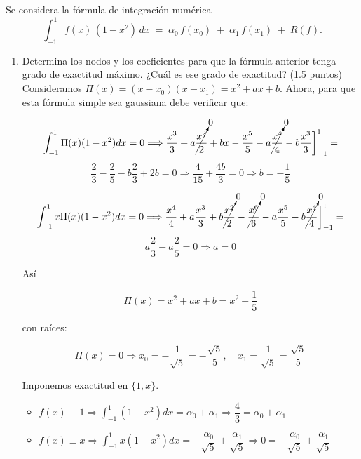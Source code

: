 \documentclass[12pt]{article}
\begin{document}
    \begin{ejercicio}[3 puntos]
        Se considera la fórmula de integración numérica
        \[
        \int_{-1}^{1} f(x)\,(1 - x^2)\,dx \;=\; \alpha_0\,f(x_0)\;+\;\alpha_1\,f(x_1)\;+\;R(f).
        \]
        \begin{enumerate}
          \item Determina los nodos y los coeficientes para que la fórmula anterior tenga grado de exactitud máximo. ¿Cuál es ese grado de exactitud? (1.5 puntos) \\
          
          Consideramos $\Pi(x) = (x-x_0)(x-x_1) = x^2+ax+b$. Ahora, para que esta fórmula simple sea gaussiana debe verificar que: 

          $$\int_{-1}^{1} \Pi(x)(1-x^2)dx = 0 \Longrightarrow \dfrac{x^3}{3} + a \cancelto{0}{\dfrac{x^2}{2}} + bx - \dfrac{x^5}{5} - a \cancelto{0}{\dfrac{x^4}{4}} - b \dfrac{x^3}{3} \bigg]_{-1}^{1} =$$
          $$\dfrac{2}{3} - \dfrac{2}{5} - b \dfrac{2}{3} + 2b = 0 \Longrightarrow \dfrac{4}{15} + \dfrac{4b}{3} = 0 \Longrightarrow \boxed{b = -\dfrac{1}{5}}$$

          $$\int_{-1}^{1} x \Pi(x)(1-x^2)dx = 0 \Longrightarrow \dfrac{x^4}{4} + a \dfrac{x^3}{3} + b \cancelto{0}{\dfrac{x^2}{2}} - \cancelto{0}{\dfrac{x^6}{6}} - a \dfrac{x^5}{5} - b \cancelto{0}{\dfrac{x^4}{4}} \bigg]_{-1}^{1} =$$
          $$a \dfrac{2}{3} - a \dfrac{2}{5} = 0 \Longrightarrow \boxed{a = 0}$$

          Así

          $$\Pi(x) = x^2+ax+b = x^2 - \dfrac{1}{5}$$

          con raíces:

          $$\Pi(x) = 0 \Longrightarrow x_0 = -\dfrac{1}{\sqrt{5}} = -\dfrac{\sqrt{5}}{5}, \quad x_1 = \dfrac{1}{\sqrt{5}} = \dfrac{\sqrt{5}}{5}$$

          Imponemos exactitud en $\{1,x\}$.

          \begin{itemize}
            \item $f(x) \equiv 1 \Longrightarrow \displaystyle\int_{-1}^{1} (1-x^2) dx = \alpha_0 + \alpha_1 \Longrightarrow \dfrac{4}{3} = \alpha_0 + \alpha_1$
            \item $f(x) \equiv x \Longrightarrow \displaystyle\int_{-1}^{1} x(1-x^2) dx = -\dfrac{\alpha_0}{\sqrt{5}} + \dfrac{\alpha_1}{\sqrt{5}}  \Longrightarrow 0 = -\dfrac{\alpha_0}{\sqrt{5}} + \dfrac{\alpha_1}{\sqrt{5}}$
          \end{itemize}


\end{enumerate}
\end{ejercicio}
\end{document}
